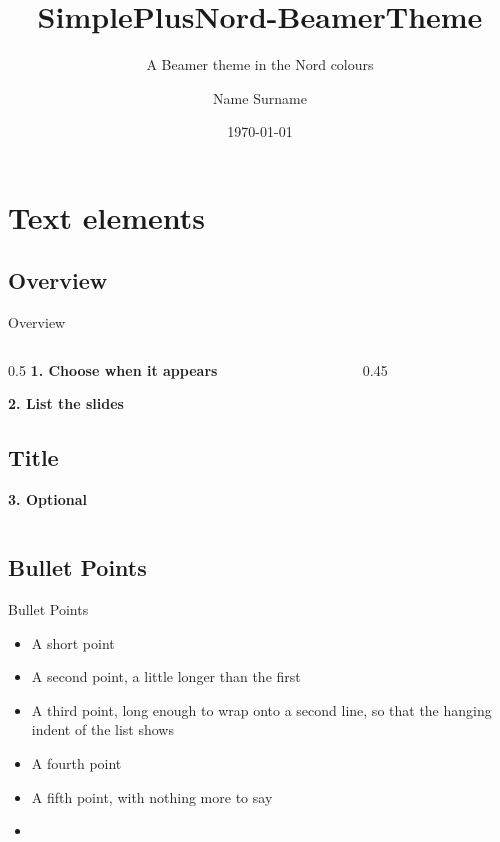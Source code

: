 \documentclass[aspectratio=1610,xcolor=dvipsnames]{beamer}
\title{SimplePlusNord-BeamerTheme}
\subtitle{A Beamer theme in the Nord colours}
\author{Name Surname}
\institute{Organization}
\date{\today}
\begin{document}
\begin{frame}
    \titlepage
\end{frame}

\section{Text elements}

\subsection{Overview}
\begin{frame}[fragile]{Overview}
\begin{columns}[T,onlytextwidth]
\begin{column}{0.5\textwidth}
\textbf{1. Choose when it appears}\par\smallskip
\begin{codeonly}
\end{codeonly}
\smallskip
\textbf{2. List the slides}\par\smallskip
\begin{codeonly}
\subsection{Title}
\end{codeonly}
\smallskip
\textbf{3. Optional}\par\smallskip
\begin{codeonly}
\tocnumbers
\end{codeonly}
\end{column}
\begin{column}{0.45\textwidth}
\tableofcontents[currentsection,subsectionstyle=show/show/hide]
\end{column}
\end{columns}
\end{frame}

\subsection{Bullet Points}
\begin{frame}{Bullet Points}
    \begin{itemize}
        \item A short point
        \item A second point, a little longer than the first
        \item A third point, long enough to wrap onto a second line, so that the hanging indent of the list shows
        \item A fourth point
        \item A fifth point, with nothing more to say
        \item {}
    \end{itemize}
\end{frame}
\end{document}

